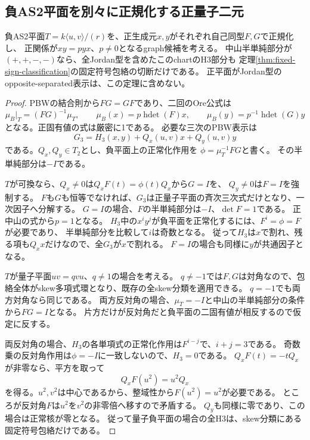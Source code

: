 \subsection{負AS2平面を別々に正規化する正量子二元}
\label{subsec:h3-order2-22-rank4-opposite-separated}
\begin{theorem}\label{thm:h3-order2-22-rank4-opposite-separated}
負AS2平面$T=k\langle u,v\rangle/(r)$を、正生成元$x,y$がそれぞれ自己同型$F,G$で正規化し、
正関係が$xy=pyx$、$p\ne0$となるgraph候補を考える。
中山半単純部分が$(+,+,-,-)$なら、全Jordan型を含めたこのchartのH3部分も
定理\ref{thm:fixed-sign-classification}の固定符号包絡の切断だけである。
正平面がJordan型のopposite-separated表示は、この定理に含めない。
\end{theorem}
\begin{proof}
PBWの結合則から$FG=GF$であり、二回のOre公式は
\[
 \mu_B|_T=(FG)^{-1}\mu_T,\qquad
 \mu_B(x)=p\operatorname{hdet}(F)x,\qquad
 \mu_B(y)=p^{-1}\operatorname{hdet}(G)y
\]
となる。正固有値の式は厳密に1である。
必要な三次のPBW表示は
\[
 G_3=H_3(x,y)+Q_x(u,v)x+Q_y(u,v)y
\]
である。$Q_x,Q_y\in T_2$とし、負平面上の正常化作用を
$\phi=\mu_T^{-1}FG$と書く。
その半単純部分は$-I$である。

$T$が可換なら、$Q_x\ne0$は$Q_xF(t)=\phi(t)Q_x$から$G=I$を、
$Q_y\ne0$は$F=I$を強制する。
 $F$も$G$も恒等でなければ、$G_3$は正量子平面の斉次三次式だけとなり、一次因子へ分解する。
$G=I$の場合、$F$の半単純部分は$-I$、$\det F=1$である。
正中山の式から$p=1$となる。
$H_3$中の$x^iy^j$が負平面を正常化するには、$F^i=\phi=F$が必要であり、
半単純部分を比較して$i$は奇数となる。
従って$H_3$は$x$で割れ、残る項も$Q_xx$だけなので、全$G_3$が$x$で割れる。
$F=I$の場合も同様に$y$が共通因子となる。

$T$が量子平面$uv=qvu$、$q\ne1$の場合を考える。
$q\ne-1$では$F,G$は対角なので、包絡全体がskew多項式環となり、既存の全skew分類を適用できる。
$q=-1$でも両方対角なら同じである。
両方反対角の場合、$\mu_T=-I$と中山の半単純部分の条件から$FG=I$となる。
片方だけが反対角だと負平面の二固有値が相反するので仮定に反する。

両反対角の場合、$H_3$の各単項式の正常化作用は$F^{i-j}$で、$i+j=3$である。
奇数乗の反対角作用は$\phi=-I$に一致しないので、$H_3=0$である。
$Q_xF(t)=-tQ_x$が非零なら、平方を取って
\[
 Q_xF(u^2)=u^2Q_x
\]
を得る。$u^2,v^2$は中心であるから、整域性から$F(u^2)=u^2$が必要である。
ところが反対角$F$は$u^2$を$v^2$の非零倍へ移すので矛盾する。
$Q_y$も同様に零であり、この場合は正常核が零となる。
従って量子負平面の場合の全H3は、skew分類にある固定符号包絡だけである。


\end{proof}
